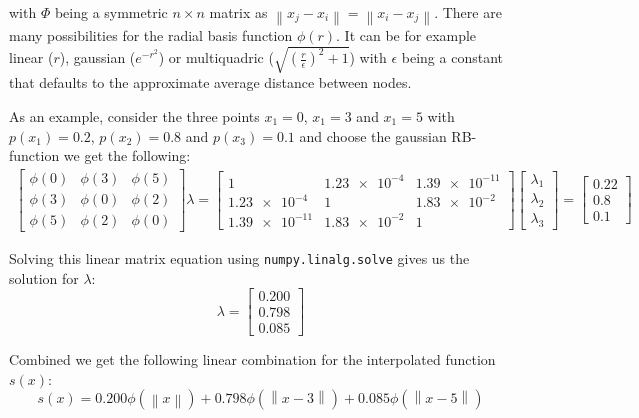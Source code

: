 with $\Phi$ being a symmetric $n \times n $ matrix as $\left\|x_j-x_i\right\|=\left\|x_i-x_j\right\|$. There are many possibilities for the radial basis function $\phi(r)$. It can be for example linear ($r$), gaussian ($e^{-r^2}$) or multiquadric ($\sqrt{\left(\frac{r}{\epsilon}\right)^2 + 1}$) with $\epsilon$ being a constant that defaults to the approximate average distance between nodes.

As an example, consider the three points $x_1=0$, $x_1=3$ and $x_1=5$ with $p(x_1)=0.2$, $p(x_2)=0.8$ and $p(x_3)=0.1$ and choose the gaussian RB-function we get the following:
\begin{align}
	\begin{bmatrix}
		\phi(0) & \phi(3)  & \phi(5) \\
		\phi(3) & \phi(0) & \phi(2) \\
		\phi(5) & \phi(2)  & \phi(0)
	\end{bmatrix} 
	\lambda
	=
		\begin{bmatrix}
			1              & \num{1.23e-4} & \num{1.39e-11} \\
			\num{1.23e-4}  & 1             & \num{1.83e-2}  \\
			\num{1.39e-11} & \num{1.83e-2} & 1
		\end{bmatrix} 
	\begin{bmatrix}
\lambda_1 \\
\lambda_2 \\
\lambda_3
\end{bmatrix}
=
\begin{bmatrix}
0.22\\0.8\\0.1
\end{bmatrix}
\end{align}

Solving this linear matrix equation using \texttt{numpy.linalg.solve} gives us the solution for $\lambda$:
\begin{equation}
	\lambda=\begin{bmatrix}
	0.200 \\0.798  \\0.085
	\end{bmatrix}
\end{equation}

Combined we get the following linear combination for the interpolated function $s(x)$:
\begin{equation}
	s(x)=0.200\phi(\left\|x\right\|)+
		0.798\phi(\left\|x-3\right\|)+
		0.085\phi(\left\|x-5\right\|)
\end{equation}



